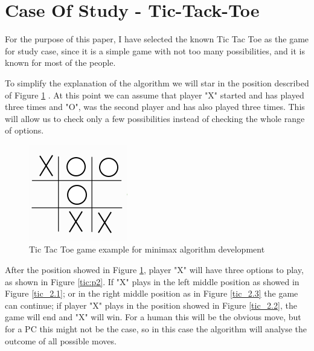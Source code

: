 \documentclass[conference]{IEEEtran}
\begin{document}
\section{Case Of Study - Tic-Tack-Toe}

For the purpose of this paper, I have selected the known Tic Tac Toe as the game for study case, since it is a simple game with not too many possibilities, and it is known for most of the people.

To simplify the explanation of the algorithm we will star in the position described of Figure \ref{tic:p1} \cite{tictac}. At this point we can assume that player "X" started and has played three times and "O", was the second player and has also played three times. This will allow us to check only a few possibilities instead of checking the whole range of options.

\begin{figure}[H]
\centering
\includegraphics[scale=0.55]{img/chess1.png}
\caption{Tic Tac Toe game example for minimax algorithm development}
\label{tic:p1}
\end{figure}

After the position showed in Figure \ref{tic:p1}, player "X" will have three options to play, as shown in Figure \ref{tic:p2}. If "X" plays in the left middle position as showed in Figure \ref{tic_2.1}; or in the right middle position as in Figure \ref{tic_2.3} the game can continue; if player "X" plays in the position showed in Figure \ref{tic_2.2}, the game will end and "X" will win. For a human this will be the obvious move, but for a PC this might not be the case, so in this case the algorithm will analyse the outcome of all possible moves.
\end{document}
